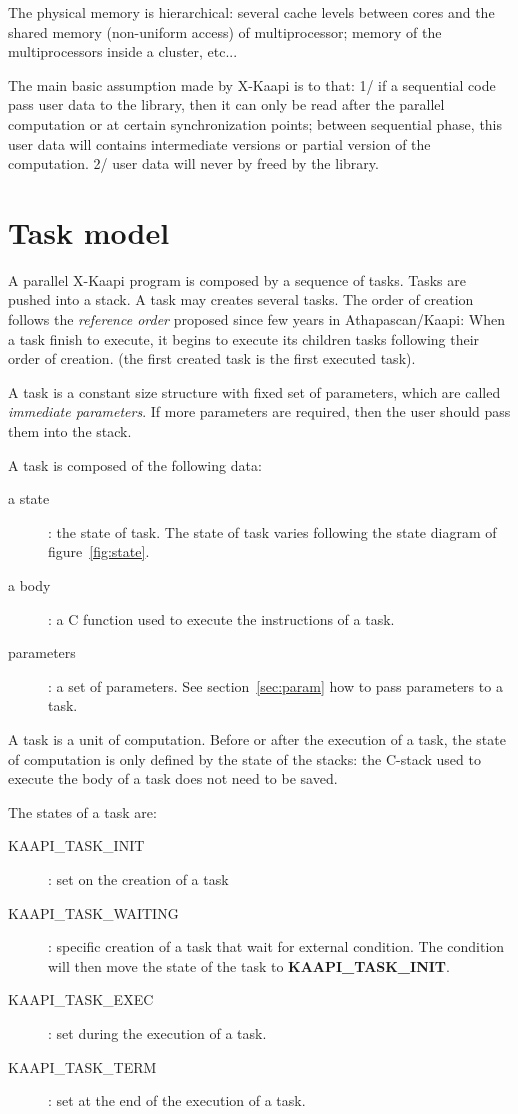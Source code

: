 \documentclass{report}
\newcommand{\kaapi}{\textsc{X}-Kaapi\xspace}
\begin{document}
The physical memory is hierarchical: several cache levels between cores and the shared memory (non-uniform access) of multiprocessor; memory of the multiprocessors inside a cluster, etc...

The main basic assumption made by \kaapi is to that: 1/ if a sequential code pass user data to the library, then it can only be read after the parallel computation or at certain synchronization points; between sequential phase, this user data will contains intermediate versions or partial version of the computation. 2/ user data will never by freed by the library.

\section{Task model}

A parallel \kaapi program is composed by a sequence of tasks. Tasks are pushed into a stack. 
A task may creates several tasks. The order of creation follows the \textit{reference order} proposed since few years in Athapascan/Kaapi: When a task finish to execute, it begins to execute its children tasks following their order of creation.
(the first created task is the first executed task).

A task is a constant size structure with fixed set of parameters, which are called \textit{immediate parameters}. If more parameters are required, then  the user should pass them into the stack. 

A task is composed of the following data:
\begin{description}
\item [a state]: the state of task. The state of task varies following the state diagram of figure~\ref{fig:state}.
\item [a body]: a C function used to execute the instructions of a task.
\item [parameters]: a set of parameters. See section~\ref{sec:param} how to pass parameters to a task.
\end{description}

A task is a unit of computation. Before or after the execution of a task, the state of computation is only defined
by the state of the stacks: the C-stack used to execute the body of a task does not need to be saved.

The states of a task are:
\begin{description}
\item [KAAPI\_TASK\_INIT]: set on the creation of a task
\item [KAAPI\_TASK\_WAITING]: specific creation of a task that wait for external condition. The condition will then move the state of the task to \textbf{KAAPI\_TASK\_INIT}.
\item [KAAPI\_TASK\_EXEC]: set during the execution of a task.
\item [KAAPI\_TASK\_TERM]: set at the end of the execution of a task.
\end{description}
\end{document}
